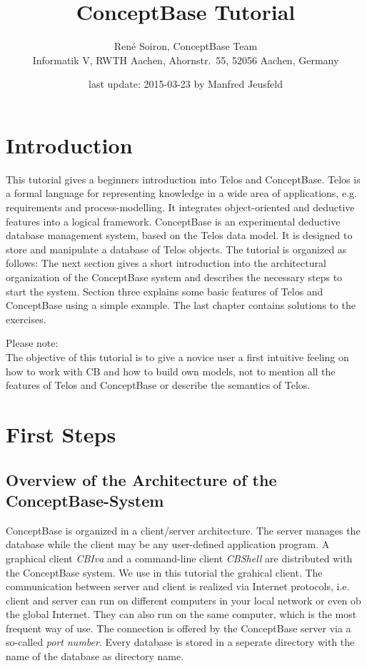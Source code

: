 \documentclass[10pt,a4paper]{article}
\author{
Ren{\'e} Soiron, ConceptBase Team\\
{\small Informatik V, RWTH Aachen, Ahornstr.\ 55, 52056 Aachen, Germany} }
\title{\bf ConceptBase Tutorial}
\date{last update: 2015-03-23 by Manfred Jeusfeld}
\begin{document}
\maketitle

\section{Introduction}

This tutorial gives a beginners introduction into Telos and ConceptBase.
Telos is a formal language for representing knowledge in a wide
area of applications, e.g. requirements and process-modelling.
It integrates object-oriented and deductive features into a
logical framework.
ConceptBase is an experimental deductive database management
system, based on the Telos data model. It is designed to store and
manipulate a database of Telos objects.
The tutorial is organized as follows:
The next section gives a short introduction into the architectural
organization of the ConceptBase system and describes the
necessary steps to start the system.
Section three explains some basic features of Telos and ConceptBase
using a simple example.
The last chapter contains solutions to the exercises.


Please note:\\
The objective of this tutorial is to give a novice user a first intuitive
feeling on how to work with CB and how to build own models, not
to mention all the features of Telos and ConceptBase or describe
the semantics of Telos.


\section{ First Steps}


\subsection{Overview of the Architecture of the ConceptBase-System}

ConceptBase is organized in a client/server architecture. The server
manages the database while the client may be any user-defined
application program. A graphical client {\em CBIva} and a command-line
client {\em CBShell} are
distributed with the ConceptBase system. We use in this tutorial the
grahical client.
The communication between server and client is realized via Internet protocols,
i.e. client and server can run on different computers in your local network
or even ob the global Internet. They can also run on the same computer, which
is the most frequent way of use.
The connection is offered by the ConceptBase server via a so-called {\em port number}.
Every database is stored in a seperate directory with the name of
the database as directory name.
\end{document}
